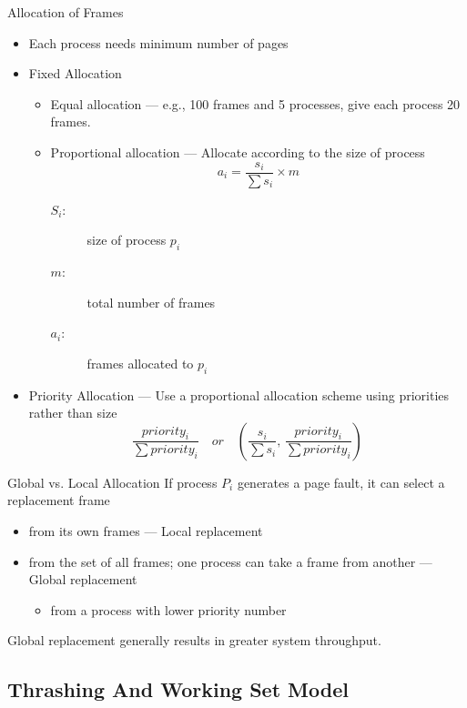 \begin{frame}{Allocation of Frames}
  \begin{itemize}
  \item Each process needs minimum number of pages
  \item Fixed Allocation
    \begin{itemize}
    \item Equal allocation --- e.g., 100 frames and 5 processes, give
      each process 20 frames.
    \item Proportional allocation --- Allocate according to the size of process
      $$a_i=\frac{s_i}{\sum{}s_i}\times{}m$$
      \begin{description}
      \item[$S_i$:] size of process $p_i$
      \item[$m$:] total number of frames
      \item[$a_i$:] frames allocated to $p_i$
      \end{description}
    \end{itemize}
  \item Priority Allocation --- Use a proportional allocation scheme
    using priorities rather than size
    $$\frac{priority_i}{\sum{}priority_i}\quad or\quad (\frac{s_i}{\sum{}s_i},\,\frac{priority_i}{\sum{}priority_i})$$
  \end{itemize}
\end{frame}

\begin{frame}{Global vs. Local Allocation}
  If process $P_i$ generates a page fault, it can select a replacement frame
  \begin{itemize}
  \item from its own frames --- \alert{Local replacement}
  \item from the set of all frames; one process can take a frame from another ---
    \alert{Global replacement}
    \begin{itemize}
    \item from a process with lower priority number
    \end{itemize}
  \end{itemize}
  \alert{Global replacement generally results in greater system throughput.}
\end{frame}

\subsection{Thrashing And Working Set Model}

